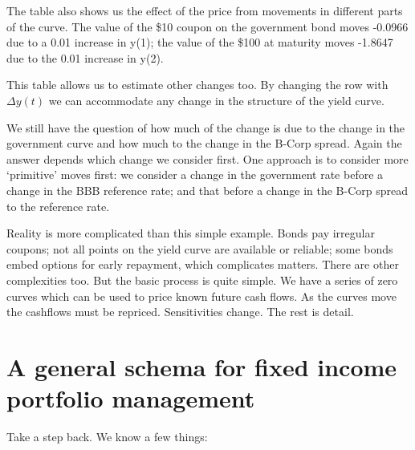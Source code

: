 The table also shows us the effect of the price from movements in different parts of the curve. The value of the \$10 coupon on the government bond moves -0.0966 due to a 0.01 increase in y(1); the value of the \$100 at maturity moves -1.8647 due to the 0.01 increase in y(2). 

This table allows us to estimate other changes too. By changing the row with $\Delta y(t)$  we can accommodate any change in the structure of the yield curve.

We still have the question of how much of the change is due to the change in the government curve and how much to the change in the B-Corp spread. Again the answer depends which change we consider first. One approach is to consider more `primitive' moves first: we consider a change in the government rate before a change in the BBB reference rate; and  that before a change in the B-Corp spread to the reference rate.

Reality is more complicated than this simple example. Bonds pay irregular coupons; not all points on the yield curve are available or reliable; some bonds embed options for early repayment, which complicates matters. There are other complexities too. But the basic process is quite simple. We have a series of zero curves which can be used to price known future cash flows. As the curves move the cashflows must be repriced. Sensitivities change. The rest is detail.


\section{A general schema for fixed income portfolio management}

Take a step back. We know a few things:


